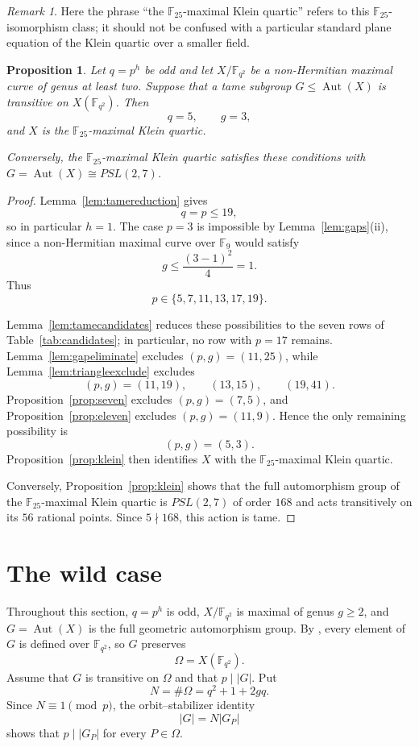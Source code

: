 \documentclass[11pt]{amsart}
\newtheorem{proposition}[theorem]{Proposition}
\theoremstyle{remark}
\newtheorem{remark}[theorem]{Remark}
\newcommand{\F}{\mathbb F}
\newcommand{\Aut}{\operatorname{Aut}}
\begin{document}
\begin{remark}
Here the phrase ``the $\F_{25}$-maximal Klein quartic'' refers to this
$\F_{25}$-isomorphism class; it should not be confused with a particular
standard plane equation of the Klein quartic over a smaller field.
\end{remark}

\begin{proposition}\label{prop:tamefinal}
Let $q=p^h$ be odd and let $X/\F_{q^2}$ be a non-Hermitian maximal
curve of genus at least two. Suppose that a tame subgroup
$G\le\Aut(X)$ is transitive on $X(\F_{q^2})$. Then
\[
q=5,\qquad g=3,
\]
and $X$ is the $\F_{25}$-maximal Klein quartic.

Conversely, the $\F_{25}$-maximal Klein quartic satisfies these
conditions with $G=\Aut(X)\cong PSL(2,7)$.
\end{proposition}

\begin{proof}
Lemma~\ref{lem:tamereduction} gives
\[
q=p\le19,
\]
so in particular $h=1$. The case $p=3$ is impossible by
Lemma~\ref{lem:gaps}(ii), since a non-Hermitian maximal curve over
$\F_9$ would satisfy
\[
g\le\frac{(3-1)^2}{4}=1.
\]
Thus
\[
p\in\{5,7,11,13,17,19\}.
\]

Lemma~\ref{lem:tamecandidates} reduces these possibilities to the
seven rows of Table~\ref{tab:candidates}; in particular, no row with
$p=17$ remains. Lemma~\ref{lem:gapeliminate} excludes $(p,g)=(11,25)$,
while Lemma~\ref{lem:triangleexclude} excludes
\[
(p,g)=(11,19),\qquad (13,15),\qquad (19,41).
\]
Proposition~\ref{prop:seven} excludes $(p,g)=(7,5)$, and
Proposition~\ref{prop:eleven} excludes $(p,g)=(11,9)$. Hence the only
remaining possibility is
\[
(p,g)=(5,3).
\]
Proposition~\ref{prop:klein} then identifies $X$ with the
$\F_{25}$-maximal Klein quartic.

Conversely, Proposition~\ref{prop:klein} shows that the full
automorphism group of the $\F_{25}$-maximal Klein quartic is
$PSL(2,7)$ of order $168$ and acts transitively on its $56$ rational
points. Since $5\nmid168$, this action is tame.
\end{proof}


\section{The wild case}

Throughout this section, $q=p^h$ is odd, $X/\F_{q^2}$ is maximal of
genus $g\ge2$, and $G=\Aut(X)$ is the full geometric automorphism
group.  By \cite[Theorem~3.10]{GSY}, every element of $G$ is defined over
$\F_{q^2}$, so $G$ preserves
\[
          \Omega=X(\F_{q^2}).
\]
Assume that $G$ is transitive on $\Omega$ and that $p\mid|G|$.  Put
\[
          N=\#\Omega=q^2+1+2gq.
\]
Since $N\equiv1\pmod p$, the orbit--stabilizer identity
\[
          |G|=N|G_P|
\]
shows that $p\mid|G_P|$ for every $P\in\Omega$.
\end{document}
